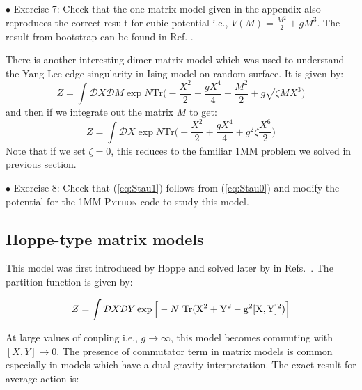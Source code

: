 \documentclass[11pt]{article}
\newcommand{\PY}{\textsc{Python }}
\begin{document}
\begin{mdframed}[backgroundcolor=blue!3] 
	\textsc{} 
	$\bullet$ Exercise 7:  Check that the one matrix model given in the appendix also reproduces the correct result for cubic potential 
	i.e., $V(M) = \frac{M^2}{2} + gM^3$. The result from bootstrap can be found in Ref. \cite{Kazakov:2021lel}. \\ 
\end{mdframed} 

There is another interesting dimer matrix model which was 
used to understand the Yang-Lee edge singularity \cite{Staudacher:1989fy} 
in Ising model on random surface.
It is given by: 
\begin{equation}
	\label{eq:Stau0}
	Z = \int \mathcal{D}X \mathcal{D}M \exp N \mbox{Tr}\Bigg(-\frac{X^2}{2} + \frac{gX^4}{4} - \frac{M^2}{2} + g \sqrt{\zeta} MX^3 \Bigg)
\end{equation}
and then if we integrate out the matrix $M$ to get:
\begin{equation}
	\label{eq:Stau1} 
	Z = \int \mathcal{D}X \exp N \mbox{Tr}\Bigg(-\frac{X^2}{2} + \frac{gX^4}{4} + g^2 \zeta  \frac{X^6}{2}   \Bigg)
\end{equation}
Note that if we set $\zeta=0$, this reduces to the familiar 1MM problem we solved in previous section. 


\begin{mdframed}[backgroundcolor=blue!3]  
	$\bullet$ Exercise 8: Check that (\ref{eq:Stau1}) follows from (\ref{eq:Stau0}) and modify the potential for the 1MM \PY code to study this model. 
\end{mdframed} 

\subsection{\label{subsec:Hoppe}Hoppe-type matrix models}
This model was first introduced by Hoppe \cite{Hoppe:1982en} and solved later by 
in Refs.~\cite{Kazakov:1998ji,Berenstein:2008eg}.
The partition function is given by:

\begin{equation}
Z = \int \mathcal{D}X \mathcal{D}Y \exp \Big[-N ~ \rm{Tr} (X^2 + Y^2 - g^2 [X,Y]^2) \Big] 
\end{equation}

At large values of coupling i.e., $ g \to \infty$, this model becomes commuting with 
$ [X,Y] \to 0$. The presence of commutator term in matrix models is common especially in 
models which have a dual gravity interpretation. 
The exact result for average action is:
\end{document}
